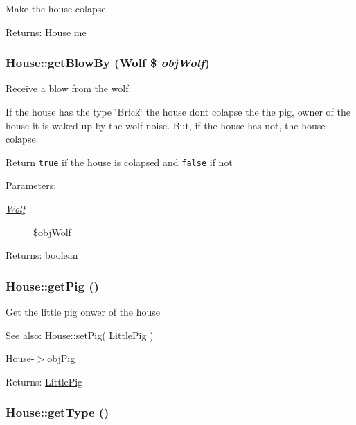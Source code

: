 Make the house colapse

\begin{Desc}
\item[Returns:]\hyperlink{class_house}{House} me \end{Desc}
\hypertarget{class_house_a2c980ac425350397d213cdfbda269e8}{
\subsubsection[{getBlowBy}]{\setlength{\rightskip}{0pt plus 5cm}House::getBlowBy ({\bf Wolf} \$ {\em objWolf})}}
\label{class_house_a2c980ac425350397d213cdfbda269e8}


Receive a blow from the wolf.

If the house has the type \char`\"{}Brick\char`\"{} the house dont colapse the the pig, owner of the house it is waked up by the wolf noise. But, if the house has not, the house colapse.

Return {\tt true} if the house is colapsed and {\tt false} if not

\begin{Desc}
\item[Parameters:]
\begin{description}
\item[{\em \hyperlink{class_wolf}{Wolf}}]\$objWolf \end{description}
\end{Desc}
\begin{Desc}
\item[Returns:]boolean \end{Desc}
\hypertarget{class_house_a497d8ab1b49d9fa1839acd685060b7f}{
\subsubsection[{getPig}]{\setlength{\rightskip}{0pt plus 5cm}House::getPig ()}}
\label{class_house_a497d8ab1b49d9fa1839acd685060b7f}


Get the little pig onwer of the house

\begin{Desc}
\item[See also:]House::setPig( LittlePig ) 

House-$>$objPig \end{Desc}
\begin{Desc}
\item[Returns:]\hyperlink{class_little_pig}{LittlePig} \end{Desc}
\hypertarget{class_house_5da805a230c3e1d39f42d30c81a3f5b3}{
\subsubsection[{getType}]{\setlength{\rightskip}{0pt plus 5cm}House::getType ()}}
\label{class_house_5da805a230c3e1d39f42d30c81a3f5b3}


